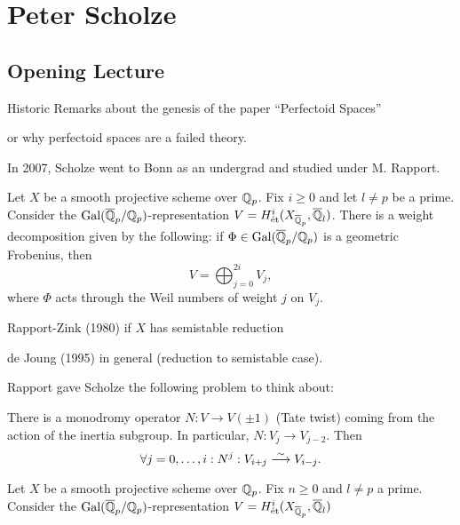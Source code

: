 \newpage
\section{Peter Scholze}
\subsection{Opening Lecture}

Historic Remarks about the genesis of the paper ``Perfectoid Spaces''

or why perfectoid spaces are a failed theory.

In 2007, Scholze went to Bonn as an undergrad and studied under M. Rapport. 


Let $X$ be a smooth projective scheme over $\mathbb{Q}_p$. Fix $i \geq 0$ and let $l \neq p$ be a prime. Consider the $\operatorname{Gal}(\overline{\mathbb{Q}}_p/\mathbb{Q}_p)$-representation $V= H_{\text{\'et}}^i(X_{\overline{\mathbb{Q}}_p}, \overline{\mathbb{Q}}_l)$. There is a weight decomposition given by the following: if $\Phi \in \operatorname{Gal}(\overline{\mathbb{Q}}_p/\mathbb{Q}_p)$ is a geometric Frobenius, then 
	\[
	V= \bigoplus_{j=0}^{2i} V_j,
	\]
where $\Phi$ acts through the Weil numbers of weight $j$ on $V_j$. 


Rapport-Zink (1980) if $X$ has semistable reduction 

de Joung (1995) in general (reduction to semistable case).


Rapport gave Scholze the following problem to think about:

There is a monodromy operator $N: V \to V(\pm 1)$ (Tate twist) coming from the action of the inertia subgroup. In particular, $N: V_j \to V_{j-2}$. Then
	\[
	\forall j=0,\ldots,i: N^j: V_{i+j} \stackrel{\sim}{\longrightarrow} V_{i-j}.
	\]









\begin{conj}
Let $X$ be a smooth projective scheme over $\mathbb{Q}_p$. Fix $n \geq 0$ and $l \neq p$ a prime. Consider the $\operatorname{Gal}(\overline{\mathbb{Q}}_p/\mathbb{Q}_p)$-representation $V= H_{\text{\'et}}^i(X_{\overline{\mathbb{Q}}_p}, \overline{\mathbb{Q}}_l)$
\end{conj}



